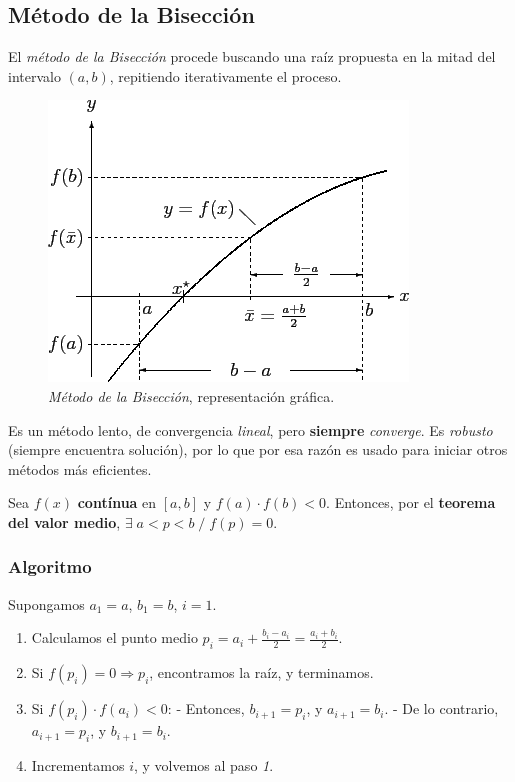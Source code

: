 \documentclass[10pt,a4paper]{article}
\begin{document}
\subsection{Método de la Bisección}

El \textit{método de la Bisección} procede buscando una raíz propuesta en la mitad del intervalo $(a,b)$, repitiendo iterativamente el proceso.

\begin{figure}
  \label{fig:bisection}
  \caption{\textit{Método de la Bisección}, representación gráfica.}
  \centering
  \hbox{\includegraphics[width=0.3\textwidth-\fboxrule-\fboxrule]{img/bisection.png}}  
\end{figure}	

Es un método lento, de convergencia \textit{lineal}, pero \textbf{siempre} \textit{converge}. Es \textit{robusto} (siempre encuentra solución), por lo que por esa razón es usado para iniciar otros métodos más eficientes.

Sea $f(x)$ \textbf{contínua} en $[a,b]$ y $f(a)\cdot f(b)<0$. Entonces, por el \textbf{teorema del valor medio}, $\exists \; a<p<b \; / \; f(p) = 0$.

\subsubsection{Algoritmo}
Supongamos $a_1=a$, $b_1=b$, $i=1$.
\begin{enumerate}
\item Calculamos el punto medio $p_i = a_i + \frac{b_i - a_i}{2}=\frac{a_i+b_i}{2}$.
\item Si $f(p_i)=0 \Rightarrow p_i$, encontramos la raíz, y terminamos.
\item Si $f(p_i)\cdot f(a_i)<0$:
\subitem - Entonces, $b_{i+1} = p_i$, y $a_{i+1}=b_i$.
\subitem - De lo contrario, $a_{i+1} = p_i$, y $b_{i+1}=b_i$.
\item Incrementamos $i$, y volvemos al paso \textit{1}.
\end{enumerate}
\end{document}
